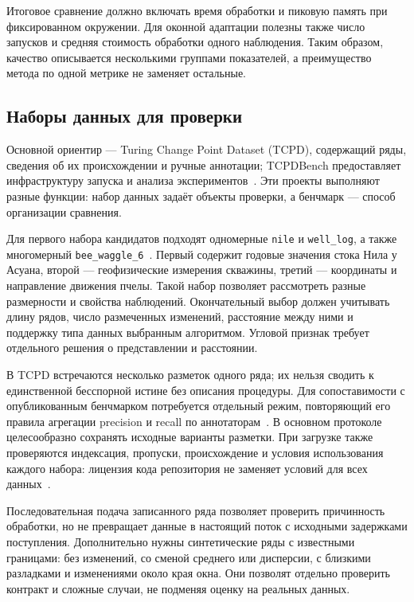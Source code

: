 Итоговое сравнение должно включать время обработки и пиковую память
при фиксированном окружении. Для оконной адаптации полезны также
число запусков и средняя стоимость обработки одного наблюдения.
Таким образом, качество описывается несколькими группами показателей,
а преимущество метода по одной метрике не заменяет остальные.

\subsection{Наборы данных для проверки}

Основной ориентир --- Turing Change Point Dataset (TCPD),
содержащий ряды, сведения об их происхождении и ручные аннотации;
TCPDBench предоставляет инфраструктуру запуска и анализа
экспериментов~\cite{tcpd,tcpdbench}. Эти проекты выполняют
разные функции: набор данных задаёт объекты проверки,
а бенчмарк --- способ организации сравнения.

Для первого набора кандидатов подходят одномерные \texttt{nile}
и \texttt{well\_log}, а также многомерный
\texttt{bee\_waggle\_6}~\mbox{\cite{tcpdnile,tcpdwell,tcpdbee}}.
Первый содержит годовые значения стока Нила у Асуана,
второй --- геофизические измерения скважины,
третий --- координаты и направление движения пчелы.
Такой набор позволяет рассмотреть разные размерности и свойства
наблюдений. Окончательный выбор должен учитывать длину рядов,
число размеченных изменений, расстояние между ними и поддержку
типа данных выбранным алгоритмом. Угловой признак требует
отдельного решения о представлении и расстоянии.

В TCPD встречаются несколько разметок одного ряда; их нельзя
сводить к единственной бесспорной истине без описания процедуры.
Для сопоставимости с опубликованным бенчмарком потребуется отдельный
режим, повторяющий его правила агрегации precision и recall
по аннотаторам~\cite{vandenburg2022}. В основном протоколе
целесообразно сохранять исходные варианты разметки.
При загрузке также проверяются индексация, пропуски, происхождение
и условия использования каждого набора: лицензия кода репозитория
не заменяет условий для всех данных~\cite{tcpd}.

Последовательная подача записанного ряда позволяет проверить
причинность обработки, но не превращает данные в настоящий поток
с исходными задержками поступления. Дополнительно нужны
синтетические ряды с известными границами: без изменений,
со сменой среднего или дисперсии, с близкими разладками
и изменениями около края окна. Они позволят отдельно проверить
контракт и сложные случаи, не подменяя оценку на реальных данных.

